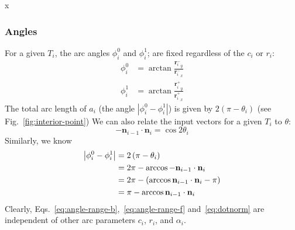 \documentclass{article}
\begin{document}
%
x\subsubsection{Angles}
%
For a given $T_i$, the arc angles $\phi^0_i$ and $\phi^{1}_{i}$; are fixed regardless of the $c_i$ or $r_{i}$:
%
\begin{align}
  \label{eq:angle-range-b}
  \phi^{0}_{i} &= \arctan \frac{{\mathbf{r}^{-}_{i}}_{y}}{{\mathbf{r}^{-}_{i}}_{x}}\\
  \label{eq:angle-range-f}
  \phi^{1}_{i} &= \arctan \frac{{\mathbf{r}^{+}_{i}}_{y}}{{\mathbf{r}^{+}_{i}}_{x}}
\end{align}
%
The total arc length of $a_i$ (the angle $\left|\phi^0_i -\phi^1_i\right|$) is given by $2\left(\pi-\theta_i\right)$ (see Fig.~\ref{fig:interior-point})
%
We can also relate the input vectors for a given $T_{i}$ to $\theta$:
%
\begin{equation}
  \label{eq:dotnorm}
  -\mathbf{n}_{i-1} \cdot \mathbf{n}_i = \cos 2\theta_i
\end{equation}
%
Similarly, we know
%
\begin{align}
  \notag
  \left|\phi^0_i -\phi^1_i\right| &= 2\left(\pi-\theta_i\right)\\
  \notag
  &= 2\pi-\arccos -\mathbf{n}_{i-1} \cdot \mathbf{n}_i \\
  \notag
  &= 2\pi-\left(\arccos \mathbf{n}_{i-1} \cdot \mathbf{n}_i - \pi\right)\\
  \label{eq:arclen-dot}
  &= \pi-\arccos \mathbf{n}_{i-1} \cdot \mathbf{n}_i
\end{align}
%
Clearly, Eqs.~\eqref{eq:angle-range-b},~\eqref{eq:angle-range-f} and~\eqref{eq:dotnorm} are independent of other arc parameters $c_{i}$, $r_{i}$, and $\alpha_i$.
%
\end{document}
